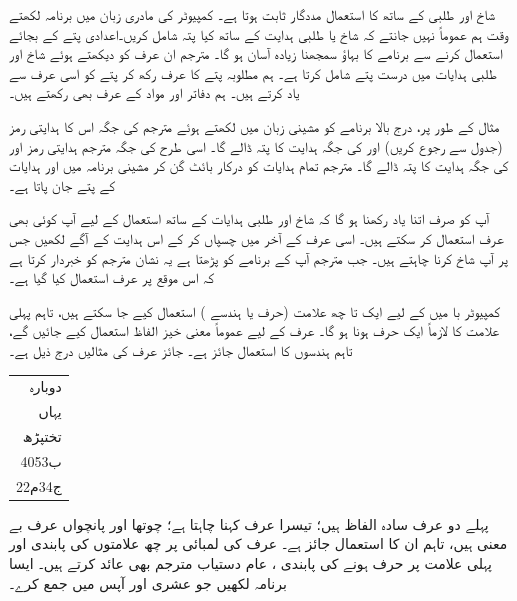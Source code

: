 شاخ اور طلبی  کے ساتھ کا استعمال مددگار ثابت ہوتا ہے۔ کمپیوٹر کی مادری زبان میں برنامہ لکھتے وقت  ہم عموماً نہیں جانتے کہ شاخ یا طلبی ہدایت کے ساتھ کیا پتہ شامل کریں۔اعدادی پتے کے بجائے  استعمال کرنے سے  برنامے کا بہاؤ  سمجھنا  زیادہ  آسان ہو گا۔ مترجم ان عرف  کو دیکھتے ہوئے شاخ اور طلبی  ہدایات میں  درست پتے شامل کرتا ہے۔ ہم مطلوبہ پتے کا  عرف  رکھ کر پتے کو اسی عرف سے یاد کرتے ہیں۔ ہم دفاتر اور مواد  کے عرف بھی رکھتے ہیں۔

مثال کے طور پر، درج بالا برنامے کو مشینی زبان میں  لکھتے ہوئے مترجم  \sJZ کی جگہ اس کا ہدایتی رمز   (جدول  سے رجوع کریں)  اور    کی جگہ \sHLT ہدایت کا پتہ ڈالے گا۔ اسی طرح \sJMP کی جگہ مترجم  ہدایتی رمز    اور    کی جگہ   ہدایت \DCR{\regC} کا پتہ ڈالے گا۔ مترجم تمام ہدایات کو درکار بائٹ گن کر    مشینی برنامہ میں   \sHLT اور \sJMP ہدایات کے پتے جان پاتا ہے۔

آپ کو صرف اتنا یاد رکھنا ہو گا کہ شاخ اور طلبی ہدایات کے ساتھ استعمال کے لیے  آپ کوئی بھی  عرف  استعمال کر سکتے ہیں۔ اسی عرف کے آخر میں   چسپاں کر کے  اس ہدایت کے آگے لکھیں جس پر آپ شاخ کرنا  چاہتے ہیں۔ جب مترجم آپ کے برنامے کو پڑھتا ہے یہ نشان  مترجم کو خبردار کرتا ہے کہ اس  موقع پر  عرف  استعمال کیا گیا ہے۔

کمپیوٹر با میں کے لیے ایک  تا  چھ    علامت (حرف یا ہندسے ) استعمال کیے جا سکتے ہیں، تاہم پہلی علامت کا  لازماً ایک  حرف  ہونا ہو گا۔ عرف کے  لیے  عموماً معنی خیز الفاظ استعمال کیے جائیں گے،  تاہم ہندسوں کا استعمال جائز ہے۔ جائز عرف کی  مثالیں درج ذیل ہے۔
 \begin{center}
\begin{tabular}{r}
دوبارہ\\ 
یہاں\\
تختپڑھ\\
ب4053\\
ج34م22 
\end{tabular}
\end{center}
پہلے دو  عرف   سادہ الفاظ ہیں؛ تیسرا  عرف    کہنا چاہتا ہے؛ چوتھا اور پانچواں  عرف بے معنی   ہیں، تاہم ان کا استعمال جائز ہے۔ عرف کی لمبائی پر چھ علامتوں کی  پابندی اور پہلی علامت    پر  حرف ہونے کی   پابندی  ، عام  دستیاب مترجم    بھی عائد کرتے ہیں۔
ایسا برنامہ لکھیں جو عشری  اور  آپس میں جمع کرے۔

